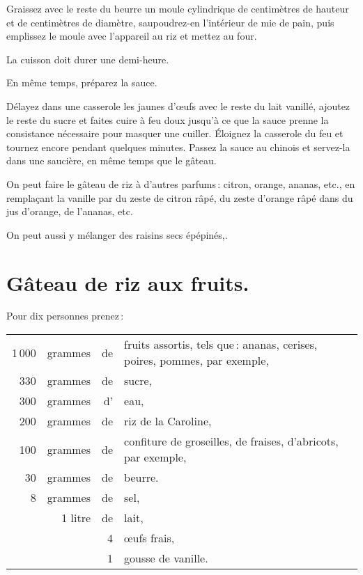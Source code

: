 Graissez avec le reste du beurre un moule cylindrique de {\mmm}
centimètres de hauteur et de {\mmm} centimètres de diamètre,
saupoudrez-en l'intérieur de mie de pain, puis emplissez le moule avec
l'appareil au riz et mettez au four.

La cuisson doit durer une demi-heure.

En même temps, préparez la sauce.

Délayez dans une casserole les jaunes d'œufs avec le reste du lait vanillé,
ajoutez le reste du sucre et faites cuire à feu doux jusqu'à ce que la sauce
prenne la consistance nécessaire pour masquer une cuiller. Éloignez la
casserole du feu et tournez encore pendant quelques minutes. Passez la sauce au
chinois et servez-la dans une saucière, en même temps que le gâteau.

\sk

On peut faire le gâteau de riz à d'autres parfums : citron, orange, ananas, etc.,
en remplaçant la vanille par du zeste de citron râpé, du zeste d'orange râpé dans
du jus d'orange, de l'ananas, etc.

On peut aussi y mélanger des raisins secs épépinés,.

\section*{\centering Gâteau de riz aux fruits.}
{}

Pour dix personnes prenez :

\footnotesize
\begin{longtable}{rrrp{16em}}
  1 000 & grammes & de & fruits assortis, tels que : ananas, cerises, poires, pommes, par exemple,        \\
    330 & grammes & de & sucre,                                                                           \\
    300 & grammes & d' & eau,                                                                             \\
    200 & grammes & de & riz de la Caroline,                                                              \\
    100 & grammes & de & confiture de groseilles, de fraises, d'abricots, par exemple,                    \\
     30 & grammes & de & beurre.                                                                          \\
      8 & grammes & de & sel,                                                                             \\
        & 1 litre & de & lait,                                                                            \\
        &         &  4 & œufs frais,                                                                      \\
        &         &  1 & gousse de vanille.                                                               \\
\end{longtable}
\normalsize

